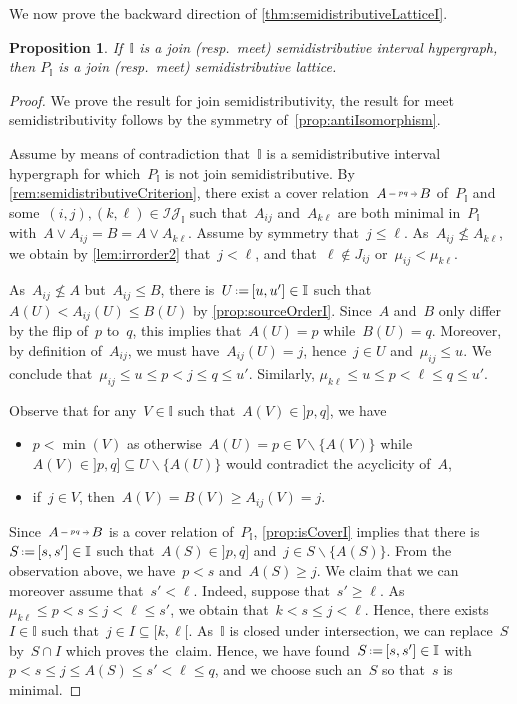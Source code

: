 \documentclass{amsart}
\newtheorem{proposition}[theorem]{Proposition}
\theoremstyle{definition}
\newcommand{\cal}[1]{\mathcal{#1}} %
\newcommand{\ssm}{\smallsetminus} %
\newcommand{\eqdef}{\mbox{\,\raisebox{0.2ex}{\scriptsize\ensuremath{\mathrm:}}\ensuremath{=}\,}} %
\newcommand{\join}{\vee} %
\newcommand{\II}{\mathbb I} %
\newcommand{\cIJ}{\cal{IJ}} %
\newcommand{\flip}[4]{\ensuremath{#1 \, \begin{tikzpicture}[scale=1,baseline=-.1cm] \path[->]  (0,0) edge node[fill=white,inner sep=2pt, font=\tiny ] {$#2#3$} (.7,0); \end{tikzpicture} \, #4}}
\begin{document}
We now prove the backward direction of \cref{thm:semidistributiveLatticeI}.

\begin{proposition}
\label{prop:semidistributiveBackward}
If~$\II$ is a join (resp.~meet) semidistributive interval hypergraph, then $P_\II$ is a join (resp.~meet) semidistributive lattice.
\end{proposition}

\begin{proof}
We prove the result for join semidistributivity, the result for meet semidistributivity follows by the symmetry of~\cref{prop:antiIsomorphism}.

Assume by means of contradiction that~$\II$ is a semidistributive interval hypergraph for which~$P_\II$ is not join semidistributive.
By \cref{rem:semidistributiveCriterion}, there exist a cover relation~$\flip{A}{p}{q}{B}$ of~$P_\II$ and some~$(i,j), (k,\ell) \in \cIJ_\II$ such that~$A_{ij}$ and~$A_{k\ell}$ are both minimal in~$P_\II$ with~$A \join A_{ij} = B = A \join A_{k\ell}$.
Assume by symmetry that~$j \le \ell$.
As~$A_{ij} \not\le A_{k\ell}$, we obtain by \cref{lem:irrorder2} that~$j < \ell$, and that~$\ell \notin J_{ij}$ or~$\mu_{ij} < \mu_{k\ell}$.

As~$A_{ij} \not\le A$ but~$A_{ij} \le B$, there is~$U \eqdef [u,u'] \in \II$ such that~$A(U) < A_{ij}(U) \le B(U)$ by \cref{prop:sourceOrderI}.
Since~$A$ and~$B$ only differ by the flip of~$p$ to~$q$, this implies that~${A(U) = p}$ while~${B(U) = q}$.
Moreover, by definition of~$A_{ij}$, we must have~$A_{ij}(U) = j$, hence~$j \in U$ and~${\mu_{ij} \le u}$.
We conclude that~$\mu_{ij} \le u \le p < j \le q \le u'$.
Similarly, ${\mu_{k\ell} \le u \le p < \ell \le q \le u'}$.

Observe that for any~$V \in \II$ such that~$A(V) \in {]p,q]}$, we have
\begin{itemize}
\item $p < \min(V)$ as otherwise~$A(U) = p \in V \ssm \{A(V)\}$ while~$A(V) \in {]p,q]} \subseteq U \ssm \{A(U)\}$ would contradict the acyclicity of~$A$,
\item if~$j \in V$, then~$A(V) = B(V) \ge A_{ij}(V) = j$.
\end{itemize}

Since~$\flip{A}{p}{q}{B}$ is a cover relation of~$P_\II$, \cref{prop:isCoverI} implies that there is~$S \eqdef [s,s'] \in \II$ such that~$A(S) \in {]p,q]}$ and~$j \in S \ssm \{A(S)\}$.
From the observation above, we have~$p < s$ and~$A(S) \ge j$.
We claim that we can moreover assume that~$s' < \ell$.
Indeed, suppose that~$s' \ge \ell$.
As~$\mu_{k\ell} \le p < s \le j < \ell \le s'$, we obtain that~$k < s \le j < \ell$.
Hence, there exists~$I \in \II$ such that~$j \in I \subseteq {[k,\ell[}$.
As~$\II$ is closed under intersection, we can replace~$S$ by~$S \cap I$ which proves the~claim.
Hence, we have found~$S \eqdef [s,s'] \in \II$ with~$p < s \le j \le A(S) \le s' < \ell \le q$, and we choose such an~$S$ so that~$s$ is minimal.


\end{proof}
\end{document}
